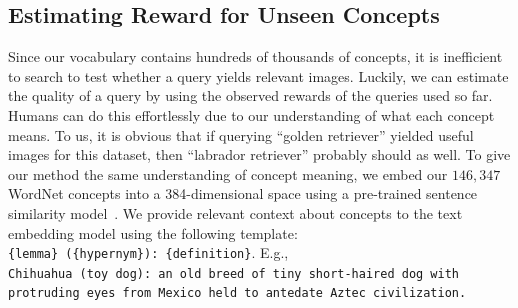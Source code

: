 \subsection{Estimating Reward for Unseen Concepts}
\label{subsec:unseen_reward}
Since our vocabulary contains hundreds of thousands of concepts, it is inefficient to search to test whether a query yields relevant images. Luckily, we can estimate the quality of a query by using the observed rewards of the queries used so far. Humans can do this effortlessly due to our understanding of what each concept means. To us, it is obvious that if querying ``golden retriever'' yielded useful images for this dataset, then ``labrador retriever'' probably should as well. To give our method the same understanding of concept meaning, we embed our $146{,}347$ WordNet concepts into a 384-dimensional space using a pre-trained sentence similarity model~\cite{reimers2019sentence}. We provide relevant context about concepts to the text embedding model using the following template:\\
{\tt {\small \{lemma\} (\{hypernym\}): \{definition\}}}. E.g.,\\
{\tt {\small Chihuahua (toy dog): an old breed of tiny short-haired dog with protruding eyes from Mexico held to antedate Aztec civilization.}}


